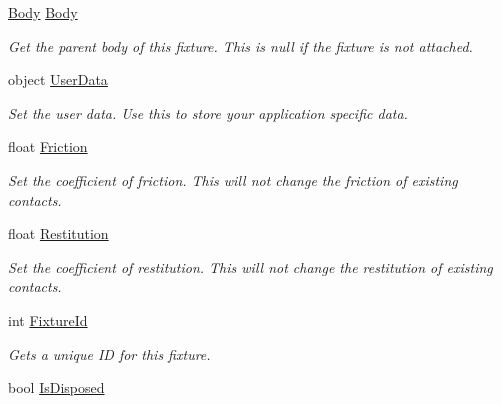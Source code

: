 \begin{DoxyCompactItemize}
\hyperlink{class_farseer_physics_1_1_dynamics_1_1_body}{Body} \hyperlink{class_farseer_physics_1_1_dynamics_1_1_fixture_a7dd9737c232708f439c50903ec704fac}{Body}
\begin{DoxyCompactList}\small\item\em Get the parent body of this fixture. This is null if the fixture is not attached. \end{DoxyCompactList}\item 
object \hyperlink{class_farseer_physics_1_1_dynamics_1_1_fixture_a165ac7953eecfa0c338b17c87cbb4376}{User\+Data}
\begin{DoxyCompactList}\small\item\em Set the user data. Use this to store your application specific data. \end{DoxyCompactList}\item 
float \hyperlink{class_farseer_physics_1_1_dynamics_1_1_fixture_a2ac947b185b86374f7ecb2924ba3963e}{Friction}
\begin{DoxyCompactList}\small\item\em Set the coefficient of friction. This will {\itshape not} change the friction of existing contacts. \end{DoxyCompactList}\item 
float \hyperlink{class_farseer_physics_1_1_dynamics_1_1_fixture_ac74572f8c152aee3b0bd1bc9b7d3795d}{Restitution}
\begin{DoxyCompactList}\small\item\em Set the coefficient of restitution. This will not change the restitution of existing contacts. \end{DoxyCompactList}\item 
int \hyperlink{class_farseer_physics_1_1_dynamics_1_1_fixture_a0af0240198acd437e8e17b01b1908bcc}{Fixture\+Id}
\begin{DoxyCompactList}\small\item\em Gets a unique I\+D for this fixture. \end{DoxyCompactList}\item 
bool \hyperlink{class_farseer_physics_1_1_dynamics_1_1_fixture_a1e49dfdb61c069c2837981ce8ebf77dc}{Is\+Disposed}
\end{DoxyCompactItemize}


